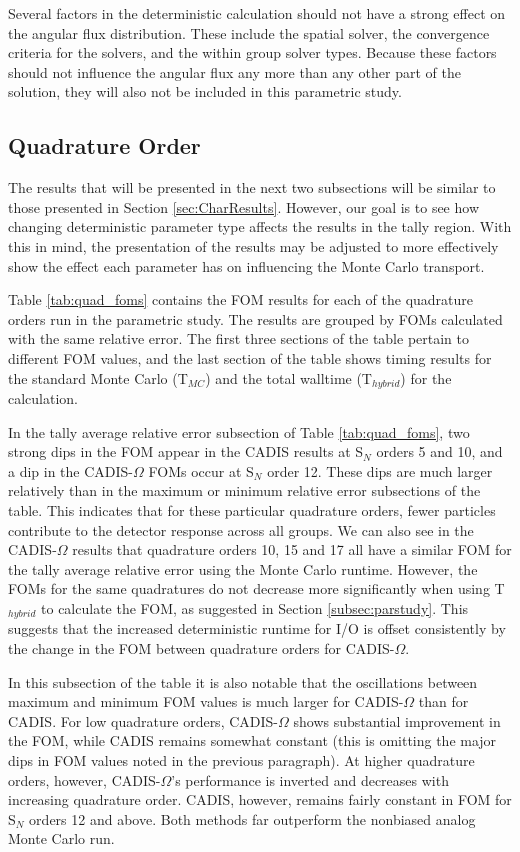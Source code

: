 Several factors in the deterministic calculation should not have a strong effect
on the angular flux distribution. These include the spatial solver, the
convergence criteria for the solvers, and the within group solver types.
Because these factors should not influence the angular flux any more than any
other part of the solution, they will also not be included in this parametric study.

\subsection{Quadrature Order}
\label{subsec:quadorder}

The results that will be presented in the next two subsections will be similar
to those presented in Section \ref{sec:CharResults}. However, our goal is to see
how changing deterministic parameter type affects the results in the tally
region. With this in mind, the presentation of the results may be adjusted to
more effectively show the effect each parameter has on influencing the Monte
Carlo transport.

Table \ref{tab:quad_foms} contains the FOM results for each of the quadrature
orders run in the parametric study. The results are grouped by FOMs calculated
with the same relative error. The first three sections of the table
pertain to different FOM values, and the last section of the table shows timing
results for the standard Monte Carlo (T$_{MC}$) and the total walltime
(T$_{hybrid}$) for the calculation.

In the tally average relative error subsection of Table \ref{tab:quad_foms},
two strong
dips in the FOM appear in the CADIS results at S$_N$ orders 5 and 10,
and a dip in the CADIS-$\Omega$ FOMs
occur at S$_N$ order 12. These dips are much larger relatively than in the maximum or
minimum relative error subsections of the table. This indicates that for these
particular quadrature orders, fewer particles contribute to the
detector response across all groups. We can also see in the CADIS-$\Omega$
results that
quadrature orders 10, 15 and 17 all have a similar FOM for the tally average
relative error using the Monte Carlo runtime. However, the FOMs for the same
quadratures do not decrease more significantly when using T$_{hybrid}$ to calculate the
FOM, as suggested in Section \ref{subsec:parstudy}. This suggests that the
increased deterministic runtime for I/O is offset consistently by the change in
the FOM between quadrature orders for CADIS-$\Omega$.

In this subsection of the table it is also notable that the oscillations between
maximum and minimum FOM values is much larger for CADIS-$\Omega$ than for CADIS.
For low quadrature orders, CADIS-$\Omega$ shows substantial improvement in the
FOM, while CADIS remains somewhat constant (this is omitting the major dips in FOM
values noted in the previous paragraph). At higher quadrature orders, however,
CADIS-$\Omega$'s performance is inverted and decreases with increasing
quadrature order. CADIS, however, remains fairly constant in FOM for S$_N$
orders 12 and above. Both methods far outperform the nonbiased analog Monte
Carlo run.

